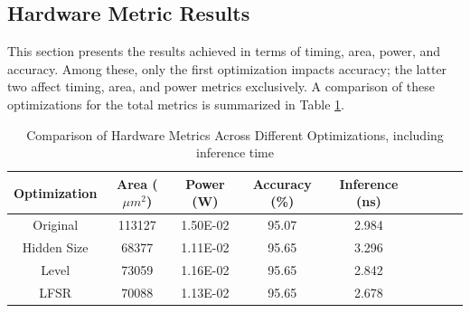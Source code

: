 \documentclass[conference]{IEEEtran}
\newcounter{todocount}
\newcommand{\todo}[1]{
  \stepcounter{todocount}
}
\begin{document}






\subsection{Hardware Metric Results}
\label{ref:hardware_metrics}

This section presents the results achieved in terms of timing, area, power, and accuracy. Among these, only the first optimization impacts accuracy; the latter two affect timing, area, and power metrics exclusively. A comparison of these optimizations for the total metrics is summarized in Table \ref{tab:optimization_metrics}. 

\todo{power to joules}

\begin{table}[h]
    \centering
    \caption{Comparison of Hardware Metrics Across Different Optimizations, including inference time}
    \label{tab:optimization_metrics}
    \begin{tabular}{@{}ccccccccc@{}}
        \toprule
        \textbf{Optimization} & \textbf{Area ($\mu m^2$)} & \textbf{Power (W)} & \textbf{Accuracy (\%)} & \textbf{Inference (ns)}  \\
        \midrule
        Original & 113127 & 1.50E-02 & 95.07 & 2.984 \\
        Hidden Size & 68377 & 1.11E-02 & 95.65 & 3.296 \\
        Level & 73059 & 1.16E-02 & 95.65 & 2.842 \\
        LFSR & 70088 & 1.13E-02 & 95.65 & 2.678 \\
        \bottomrule
    \end{tabular}
\end{table}
\end{document}
